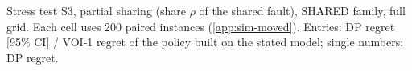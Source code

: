 \begin{table}[!htbp]
\centering
\caption{Stress test S3, partial sharing (share $\rho$ of the shared fault), SHARED family, full grid. Each cell uses 200 paired instances (\cref{app:sim-moved}). Entries: DP regret [95\% CI] / VOI-1 regret of the policy built on the stated model; single numbers: DP regret.}
\label{tab:s3-full}
\scriptsize
\setlength{\tabcolsep}{3pt}
\resizebox{\linewidth}{!}{}
\end{table}
